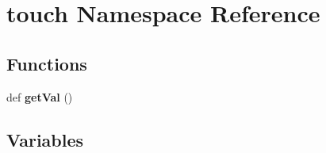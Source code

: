 \hypertarget{namespacetouch}{}\section{touch Namespace Reference}
\label{namespacetouch}
\subsection*{Functions}
\begin{DoxyCompactItemize}
\item 
\mbox{\label{namespacetouch_acb3e8a8a7f531a3bc9fc714922760938}} 
def {\bfseries get\+Val} ()
\end{DoxyCompactItemize}
\subsection*{Variables}
